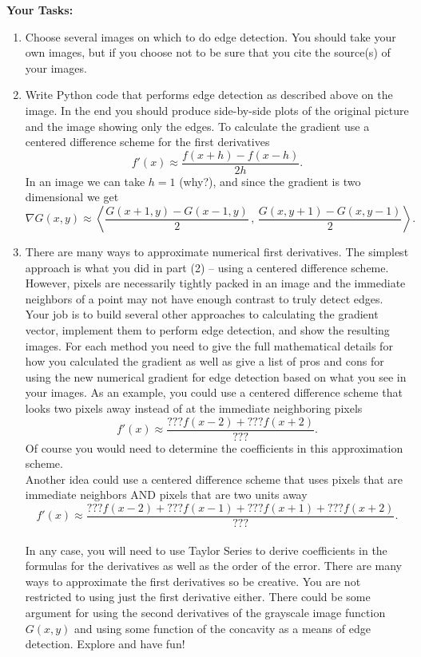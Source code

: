 \documentclass[
]{book}
\providecommand{\tightlist}{%
  \setlength{\itemsep}{0pt}\setlength{\parskip}{0pt}}
\theoremstyle{definition}
\theoremstyle{definition}
\theoremstyle{definition}
\theoremstyle{remark}
\begin{document}
\textbf{Your Tasks:}

\begin{enumerate}
\def\labelenumi{\arabic{enumi}.}
\tightlist
\item
  Choose several images on which to do edge detection. You should take your own images, but if you choose not to be sure that you cite the source(s) of your images.
\item
  Write Python code that performs edge detection as described above on the image. In the end you should produce side-by-side plots of the original picture and the image showing only the edges. To calculate the gradient use a centered difference scheme for the first derivatives
  \[ f'(x) \approx \frac{f(x+h)-f(x-h)}{2h}. \]
  In an image we can take \(h=1\) (why?), and since the gradient is two dimensional we get
  \[ \nabla G(x,y) \approx \left< \frac{G(x+1,y)-G(x-1,y)}{2} \, , \, \frac{G(x,y+1)-G(x,y-1)}{2}  \right>. \]
\item
  There are many ways to approximate numerical first derivatives. The simplest approach is what you did in part (2) -- using a centered difference scheme. However, pixels are necessarily tightly packed in an image and the immediate neighbors of a point may not have enough contrast to truly detect edges. Your job is to build several other approaches to calculating the gradient vector, implement them to perform edge detection, and show the resulting images. For each method you need to give the full mathematical details for how you calculated the gradient as well as give a list of pros and cons for using the new numerical gradient for edge detection based on what you see in your images. As an example, you could use a centered difference scheme that looks two pixels away instead of at the immediate neighboring pixels
  \[ f'(x) \approx \frac{??? f(x-2) + ??? f(x+2)}{???}. \]
  Of course you would need to determine the coefficients in this approximation scheme.\\
  Another idea could use a centered difference scheme that uses pixels that are immediate neighbors AND pixels that are two units away
  \[ f'(x) \approx \frac{??? f(x-2) + ??? f(x-1) + ??? f(x+1) + ??? f(x+2)}{???}. \]\\
  In any case, you will need to use Taylor Series to derive coefficients in the formulas for the derivatives as well as the order of the error. There are many ways to approximate the first derivatives so be creative. You are not restricted to using just the first derivative either. There could be some argument for using the second derivatives of the grayscale image function \(G(x,y)\) and using some function of the concavity as a means of edge detection. Explore and have fun!
\end{enumerate}
\end{document}
